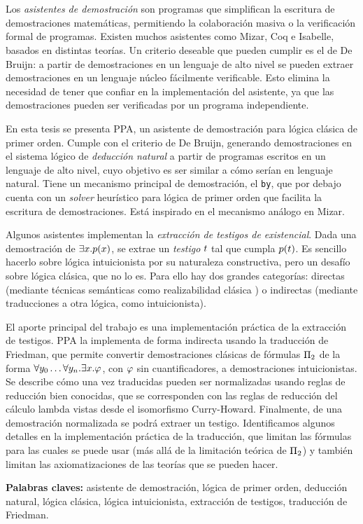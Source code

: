 \chapter*{\runtitulo}

\noindent Los \textit{asistentes de demostración} son programas que simplifican
la escritura de demostraciones matemáticas, permitiendo la colaboración masiva o
la verificación formal de programas. Existen muchos asistentes como Mizar, Coq e
Isabelle, basados en distintas teorías. Un criterio deseable que pueden cumplir
es el de De Bruijn: a partir de demostraciones en un lenguaje de alto nivel se pueden extraer demostraciones en un lenguaje núcleo fácilmente verificable. Esto elimina la necesidad de tener que confiar en la implementación del asistente, ya que las demostraciones pueden ser verificadas por un programa independiente.

En esta tesis se presenta PPA, un asistente de demostración para lógica clásica
de primer orden. Cumple con el criterio de De Bruijn, generando demostraciones
en el sistema lógico de \textit{deducción natural} a partir de programas
escritos en un lenguaje de alto nivel, cuyo objetivo es ser similar a cómo
serían en lenguaje natural. Tiene un mecanismo principal de demostración, el \texttt{by},
que por debajo cuenta con un \textit{solver} heurístico para lógica de primer
orden que facilita la escritura de demostraciones. Está inspirado en el
mecanismo análogo en Mizar.

Algunos asistentes implementan la \textit{extracción de testigos de
existencial}. Dada una demostración de $\exists x . p(x)$, se extrae
un \textit{testigo} $t$ tal que cumpla $p(t)$. Es sencillo hacerlo sobre lógica intuicionista por su naturaleza constructiva, pero un desafío sobre lógica clásica, que no lo es. Para ello hay dos grandes categorías: directas (mediante técnicas semánticas como realizabilidad clásica \cite{miquel-friedman}) o indirectas (mediante traducciones a otra lógica, como intuicionista).

El aporte principal del trabajo es una implementación práctica de la extracción
de testigos. PPA la implementa de forma indirecta usando la traducción de
Friedman, que permite convertir  demostraciones clásicas de fórmulas
$\Pi_{2}$ de la forma $\forall y_0 \dots \forall y_n . \exists
x . \varphi$, con $\varphi$ sin cuantificadores, a demostraciones intuicionistas. Se describe cómo una vez traducidas pueden
ser normalizadas usando reglas de reducción bien conocidas, que se corresponden con las reglas de reducción del cálculo lambda vistas desde el isomorfismo
Curry-Howard. Finalmente, de una demostración normalizada se podrá extraer un
testigo. Identificamos algunos detalles en la implementación práctica de la
traducción, que limitan las fórmulas para las cuales se puede usar (más allá de
la limitación teórica de $\Pi_{2}$) y también limitan las axiomatizaciones
de las teorías que se pueden hacer.

\bigskip

\noindent\textbf{Palabras claves:} asistente de demostración, lógica de primer orden, deducción natural, lógica clásica, lógica intuicionista, extracción de testigos, traducción de Friedman.